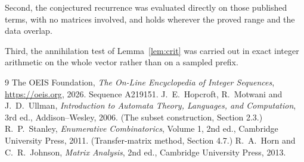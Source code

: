 \documentclass[11pt,a4paper]{article}
\theoremstyle{plain}
\theoremstyle{definition}
\begin{document}
Second, the conjectured recurrence was evaluated directly on those published terms, with no
matrices involved, and holds wherever the proved range and the data overlap.

Third, the annihilation test of Lemma~\ref{lem:crit} was carried out in exact integer
arithmetic on the whole vector rather than on a sampled prefix.

\begin{thebibliography}{9}
 The OEIS Foundation, \emph{The On-Line Encyclopedia of Integer
Sequences}, \url{https://oeis.org}, 2026. Sequence A219151.
 J.~E.~Hopcroft, R.~Motwani and J.~D.~Ullman, \emph{Introduction to Automata
Theory, Languages, and Computation}, 3rd ed., Addison--Wesley, 2006. (The subset
construction, Section 2.3.)
 R.~P.~Stanley, \emph{Enumerative Combinatorics}, Volume 1, 2nd ed.,
Cambridge University Press, 2011. (Transfer-matrix method, Section 4.7.)
 R.~A.~Horn and C.~R.~Johnson, \emph{Matrix Analysis}, 2nd ed., Cambridge
University Press, 2013.
\end{thebibliography}
\end{document}
